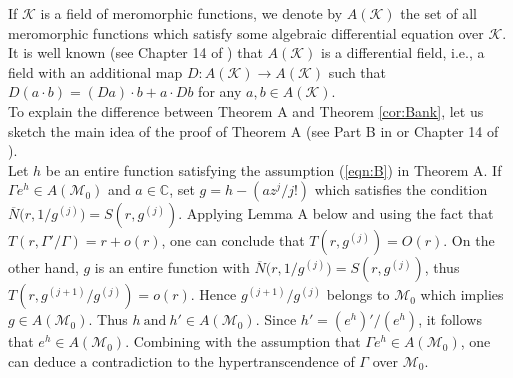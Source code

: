 \documentclass[reqno,12pt]{amsart}
\begin{document}

 


 If $\mathcal{K}$ is a field of meromorphic functions, we denote by $A(\mathcal{K})$ the set of all meromorphic functions which satisfy some algebraic differential equation over $\mathcal{K}$. It is well known (see Chapter 14 of \cite{IIpo11}) that $A(\mathcal{K})$ is a differential field, i.e., a field with an additional map $D: A(\mathcal{K})\rightarrow A(\mathcal{K})$ such that $D(a\cdot b)=(Da)\cdot b+a\cdot Db$ for any $a, b\in A(\mathcal{K})$.\\

To explain the difference between Theorem A and Theorem \ref{cor:Bank},
let us sketch the main idea of the proof of Theorem A (see Part B in \cite{Bank80} or Chapter 14 of \cite{IIpo11}). \\

Let $h$ be an entire function satisfying the assumption (\ref{eqn:B}) in Theorem A.
 If $\Gamma e^h\in A(\mathcal{M}_0)$ and $a\in\mathbb{C}$, set $g=h- (az^j/j!)$ which satisfies the condition $\overline N \big (r, 1/g^{(j)}\big ) = S(r, g^{(j)})$. Applying Lemma A below and using the fact that $T(r, \Gamma'/\Gamma)=r+o(r)$,  one can conclude that $T(r, g^{(j)})=O(r)$. On the other hand, $g$ is an entire function with $\overline N \big (r, 1/g^{(j)}\big ) = S(r, g^{(j)})$, thus $T(r, g^{(j+1)}/g^{(j)})=o(r)$. Hence $g^{(j+1)}/g^{(j)}$ belongs to $\mathcal{M}_0$ which implies $g\in A(\mathcal{M}_0)$. Thus $h\ \mbox{and}\ h'\in A(\mathcal{M}_0)$. Since $h'=(e^h)'/(e^h)$, it follows that $e^h\in A(\mathcal{M}_0)$. Combining with the assumption that $\Gamma e^h\in A(\mathcal{M}_0)$, one can deduce a contradiction to the hypertranscendence of $\Gamma$ over $\mathcal{M}_0$. \\
 
\end{document}
